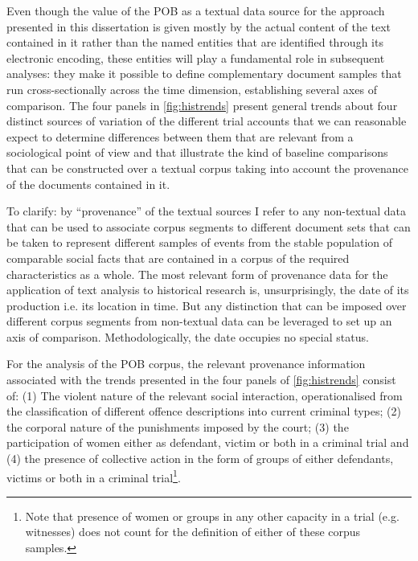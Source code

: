 Even though the value of the POB as a textual data source for the approach presented in this dissertation is given mostly by the actual content of the text contained in it rather than the named entities that are identified through its electronic encoding, these entities will play a fundamental role in subsequent analyses: they make it possible to define complementary document samples that run cross-sectionally across the time dimension, establishing several axes of comparison.
The four panels in \autoref{fig:histrends} present general trends about four distinct sources of variation of the different trial accounts that we can reasonable expect to determine differences between them that are relevant from a sociological point of view and that illustrate the kind of baseline comparisons that can be constructed over a textual corpus taking into account the provenance of the documents contained in it.

To clarify: by ``provenance'' of the textual sources I refer to any non-textual data that can be used to associate corpus segments to different document sets that can be taken to represent different samples of events from the stable population of comparable social facts that are contained in a corpus of the required characteristics as a whole.
The most relevant form of provenance data for the application of text analysis to historical research is, unsurprisingly, the date of its production i.e. its location in time.
But any distinction that can be imposed over different corpus segments from non-textual data can be leveraged to set up an axis of comparison.
Methodologically, the date occupies no special status.

For the analysis of the POB corpus, the relevant provenance information associated with the trends presented in the four panels of \autoref{fig:histrends} consist of: (1) The violent nature of the relevant social interaction, operationalised from the classification of different offence descriptions into current criminal types; (2) the corporal nature of the punishments imposed by the court; (3) the participation of women either as defendant, victim or both in a criminal trial and (4) the presence of collective action in the form of groups of either defendants, victims or both in a criminal trial\footnote{
    \label{foot:femgrps}
    Note that presence of women or groups in any other capacity in a trial (e.g. witnesses) does not count for the definition of either of these corpus samples.
}.

